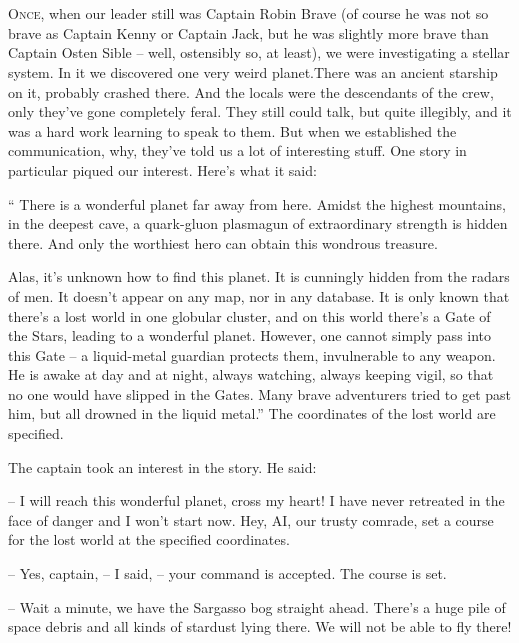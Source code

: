 \documentclass[ebook,oneside,final,openright]{memoir}
\begin{document}
\chapter{}
\par
\lettrine{O}{nce,} when our leader still was Captain Robin Brave (of course he was not so brave as Captain Kenny or Captain Jack, but he was slightly more brave than Captain Osten Sible – well, ostensibly so, at least), we were investigating a stellar system. In it we discovered one very weird planet.There was an ancient starship on it, probably crashed there. And the locals were the descendants of the crew, only they’ve gone completely feral. They still could talk, but quite illegibly, and it was a hard work learning to speak to them. But when we established the communication, why, they’ve told us a lot of interesting stuff. One story in particular piqued our interest. Here’s what it said:\par
\par
“ There is a wonderful planet far away from here. Amidst the highest mountains, in the deepest cave, a quark-gluon plasmagun of extraordinary strength is hidden there. And only the worthiest hero can obtain this wondrous treasure. \par
Alas, it’s unknown how to find this planet. It is cunningly hidden from the radars of men. It doesn’t appear on any map, nor in any database. It is only known that there’s a lost world in one globular cluster, and on this world there’s a Gate of the Stars, leading to a wonderful planet. However, one cannot simply pass into this Gate – a liquid-metal guardian protects them, invulnerable to any weapon. He is awake at day and at night, always watching, always keeping vigil, so that no one would have slipped in the Gates. Many brave adventurers tried to get past him, but all drowned in the liquid metal.” The coordinates of the lost world are specified.\par
\par
The captain took an interest in the story. He said:\par
– I will reach this wonderful planet, cross my heart! I have never retreated in the face of danger and I won’t start now. Hey, AI, our trusty comrade, set a course for the lost world at the specified coordinates.\par
– Yes, captain, – I said, – your command is accepted. The course is set.\par
– Wait a minute, we have the Sargasso bog straight ahead. There’s a huge pile of space debris and all kinds of stardust lying there. We will not be able to fly there!\par
\end{document}
